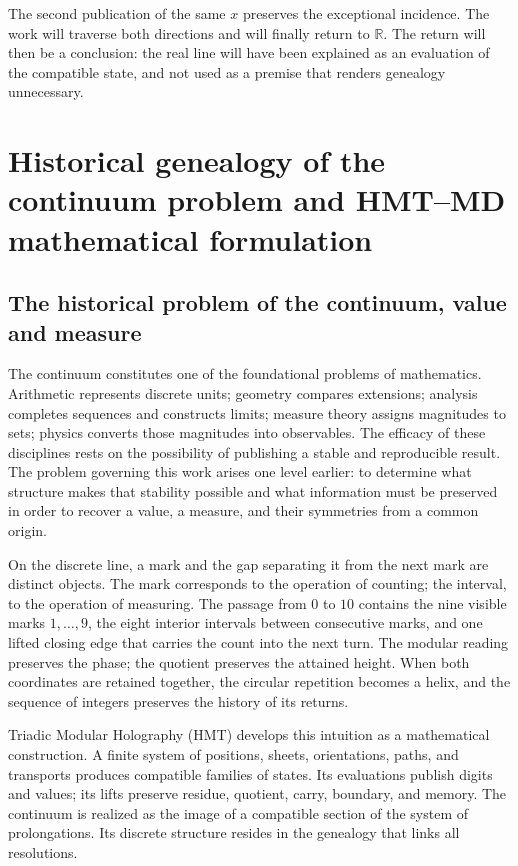 The second publication of the same \(x\) preserves the exceptional incidence.
The work will traverse both directions and will finally return to
\(\mathbb R\). The return will then be a conclusion: the real line will have
been explained as an evaluation of the compatible state, and not used
as a premise that renders genealogy unnecessary.


\section{Historical genealogy of the continuum problem and HMT–MD mathematical formulation}

\subsection*{The historical problem of the continuum, value and measure}

The continuum constitutes one of the foundational problems of mathematics. Arithmetic represents discrete units; geometry compares extensions; analysis completes sequences and constructs limits; measure theory assigns magnitudes to sets; physics converts those magnitudes into observables. The efficacy of these disciplines rests on the possibility of publishing a stable and reproducible result. The problem governing this work arises one level earlier: to determine what structure makes that stability possible and what information must be preserved in order to recover a value, a measure, and their symmetries from a common origin.

On the discrete line, a mark and the gap separating it from the next mark are
distinct objects. The mark corresponds to the operation of counting; the interval,
to the operation of measuring. The passage from \(0\) to \(10\) contains the nine
visible marks \(1,\ldots,9\), the eight interior intervals between
consecutive marks, and one lifted closing edge that carries the count into the
next turn. The modular reading preserves the phase; the quotient preserves
the attained height. When both coordinates are retained together, the
circular repetition becomes a helix, and the sequence of integers
preserves the history of its returns.

Triadic Modular Holography (HMT) develops this intuition as a
mathematical construction. A finite system of positions, sheets,
orientations, paths, and transports produces compatible families of states.
Its evaluations publish digits and values; its lifts preserve
residue, quotient, carry, boundary, and memory. The continuum is realized as
the image of a compatible section of the system of prolongations. Its
discrete structure resides in the genealogy that links all
resolutions.

